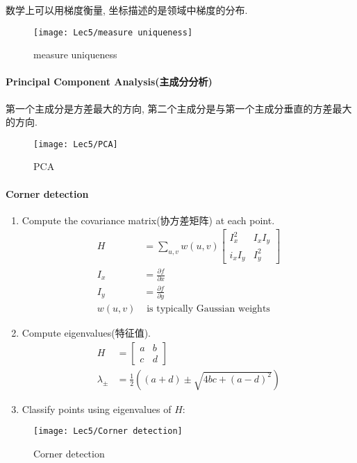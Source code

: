     数学上可以用梯度衡量, 坐标描述的是领域中梯度的分布. 
    \begin{figure}[H]
        \centering
        \texttt{[image: Lec5/measure uniqueness]}
        \caption{measure uniqueness}
    \end{figure}

\paragraph{Principal Component Analysis(主成分分析)}
第一个主成分是方差最大的方向, 第二个主成分是与第一个主成分垂直的方差最大的方向. 
\begin{figure}[H]
    \centering
    \texttt{[image: Lec5/PCA]}
    \caption{PCA}
\end{figure}

\paragraph{Corner detection}
\begin{enumerate}
    \item Compute the covariance matrix(协方差矩阵) at each point. 
    \begin{align*}
        H&=\sum_{u,v} w(u,v)\begin{bmatrix}
            I_x^2 & I_xI_y\\
            i_xI_y & I_y^2
        \end{bmatrix}\\
        I_x&=\frac{\partial f}{\partial x}\\
        I_y&=\frac{\partial f}{\partial  y}\\
        w(u,v)&\text{ is typically Gaussian weights}
    \end{align*}
    \item Compute eigenvalues(特征值).
    \begin{align*}
        H&=\begin{bmatrix}
            a&b\\c&d
        \end{bmatrix}\\
        \lambda_{\pm}&=\frac{1}{2}((a+d)\pm \sqrt{4bc+(a-d)^2})
    \end{align*}
    \item Classify points using eigenvalues of $H$:
\end{enumerate}

\begin{figure}[H]
    \centering
    \texttt{[image: Lec5/Corner detection]}
    \caption{Corner detection}
\end{figure}


